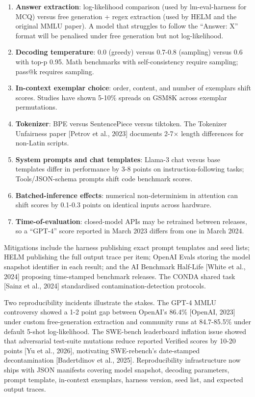 \begin{enumerate}
\def\labelenumi{\arabic{enumi}.}
\tightlist
\item
  \textbf{Answer extraction}: log-likelihood comparison (used by lm-eval-harness for MCQ) versus free generation + regex extraction (used by HELM and the original MMLU paper). A model that struggles to follow the ``Answer: X'' format will be penalised under free generation but not log-likelihood.
\item
  \textbf{Decoding temperature}: 0.0 (greedy) versus 0.7-0.8 (sampling) versus 0.6 with top-p 0.95. Math benchmarks with self-consistency require sampling; pass@k requires sampling.
\item
  \textbf{In-context exemplar choice}: order, content, and number of exemplars shift scores. Studies have shown 5-10\% spreads on GSM8K across exemplar permutations.
\item
  \textbf{Tokenizer}: BPE versus SentencePiece versus tiktoken. The Tokenizer Unfairness paper {[}Petrov et al., 2023{]} documents 2-7× length differences for non-Latin scripts.
\item
  \textbf{System prompts and chat templates}: Llama-3 chat versus base templates differ in performance by 3-8 points on instruction-following tasks; Tools/JSON-schema prompts shift code benchmark scores.
\item
  \textbf{Batched-inference effects}: numerical non-determinism in attention can shift scores by 0.1-0.3 points on identical inputs across hardware.
\item
  \textbf{Time-of-evaluation}: closed-model APIs may be retrained between releases, so a ``GPT-4'' score reported in March 2023 differs from one in March 2024.
\end{enumerate}

Mitigations include the harness publishing exact prompt templates and seed lists; HELM publishing the full output trace per item; OpenAI Evals storing the model snapshot identifier in each result; and the AI Benchmark Half-Life {[}White et al., 2024{]} proposing time-stamped benchmark releases. The CONDA shared task {[}Sainz et al., 2024{]} standardised contamination-detection protocols.

Two reproducibility incidents illustrate the stakes. The GPT-4 MMLU controversy showed a 1-2 point gap between OpenAI's 86.4\% {[}OpenAI, 2023{]} under custom free-generation extraction and community runs at 84.7-85.5\% under default 5-shot log-likelihood. The SWE-bench leaderboard inflation issue showed that adversarial test-suite mutations reduce reported Verified scores by 10-20 points {[}Yu et al., 2026{]}, motivating SWE-rebench's date-stamped decontamination {[}Badertdinov et al., 2025{]}. Reproducibility infrastructure now ships with JSON manifests covering model snapshot, decoding parameters, prompt template, in-context exemplars, harness version, seed list, and expected output traces.

